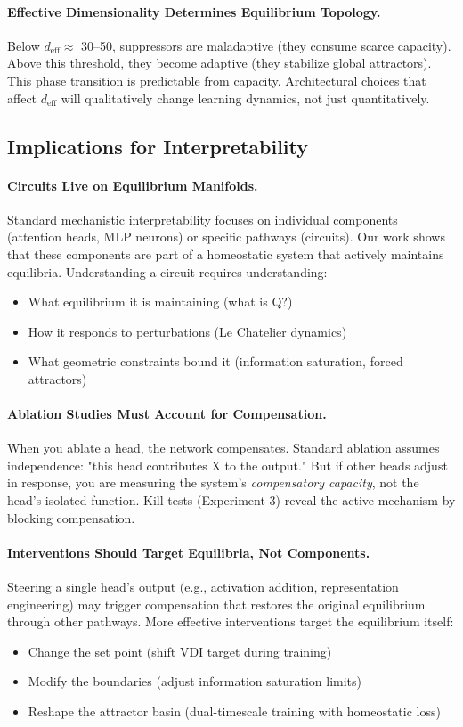 \paragraph{Effective Dimensionality Determines Equilibrium Topology.}
Below $d_{\text{eff}} \approx$ 30--50, suppressors are maladaptive (they consume scarce capacity). Above this threshold, they become adaptive (they stabilize global attractors). This phase transition is predictable from capacity. Architectural choices that affect $d_{\text{eff}}$ will qualitatively change learning dynamics, not just quantitatively.

\subsection{Implications for Interpretability}

\paragraph{Circuits Live on Equilibrium Manifolds.}
Standard mechanistic interpretability focuses on individual components (attention heads, MLP neurons) or specific pathways (circuits). Our work shows that these components are part of a homeostatic system that actively maintains equilibria. Understanding a circuit requires understanding:
\begin{itemize}
\item What equilibrium it is maintaining (what is Q?)
\item How it responds to perturbations (Le Chatelier dynamics)
\item What geometric constraints bound it (information saturation, forced attractors)
\end{itemize}

\paragraph{Ablation Studies Must Account for Compensation.}
When you ablate a head, the network compensates. Standard ablation assumes independence: "this head contributes X to the output." But if other heads adjust in response, you are measuring the system's \emph{compensatory capacity}, not the head's isolated function. Kill tests (Experiment 3) reveal the active mechanism by blocking compensation.

\paragraph{Interventions Should Target Equilibria, Not Components.}
Steering a single head's output (e.g., activation addition, representation engineering) may trigger compensation that restores the original equilibrium through other pathways. More effective interventions target the equilibrium itself:
\begin{itemize}
\item Change the set point (shift VDI target during training)
\item Modify the boundaries (adjust information saturation limits)
\item Reshape the attractor basin (dual-timescale training with homeostatic loss)
\end{itemize}

